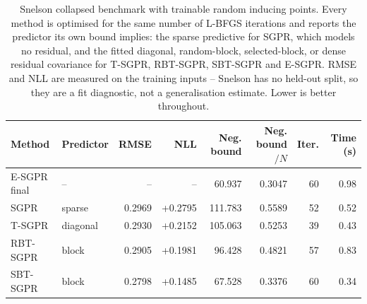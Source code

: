 \begin{table}[t]
\centering
\caption{Snelson collapsed benchmark with trainable random inducing points. Every method is optimised for the same number of L-BFGS iterations and reports the predictor its own bound implies: the sparse predictive for SGPR, which models no residual, and the fitted diagonal, random-block, selected-block, or dense residual covariance for T-SGPR, RBT-SGPR, SBT-SGPR and E-SGPR. RMSE and NLL are measured on the training inputs -- Snelson has no held-out split, so they are a fit diagnostic, not a generalisation estimate. Lower is better throughout.}
\label{tab:snelson-sgpr-t-rbt-sbt}
\begin{tabular}{llrrrrrr}
\toprule
Method & Predictor & RMSE & NLL & Neg. bound & Neg. bound$/N$ & Iter. & Time (s) \\
\midrule
E-SGPR final & -- & -- & -- & 60.937 & 0.3047 & 60 & 0.98 \\
SGPR & sparse & 0.2969 & +0.2795 & 111.783 & 0.5589 & 52 & 0.52 \\
T-SGPR & diagonal & 0.2930 & +0.2152 & 105.063 & 0.5253 & 39 & 0.43 \\
RBT-SGPR & block & 0.2905 & +0.1981 & 96.428 & 0.4821 & 57 & 0.83 \\
SBT-SGPR & block & 0.2798 & +0.1485 & 67.528 & 0.3376 & 60 & 0.34 \\
\bottomrule
\end{tabular}
\end{table}
